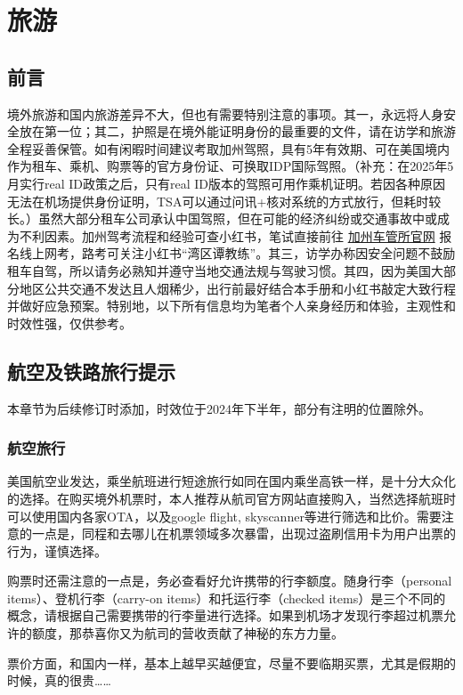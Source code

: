 \chapter{旅游}

\section{前言}
境外旅游和国内旅游差异不大，但也有需要特别注意的事项。其一，永远将人身安全放在第一位；其二，护照是在境外能证明身份的最重要的文件，请在访学和旅游全程妥善保管。如有闲暇时间建议考取加州驾照，具有5年有效期、可在美国境内作为租车、乘机、购票等的官方身份证、可换取IDP国际驾照。（补充：在2025年5月实行real ID政策之后，只有real ID版本的驾照可用作乘机证明。若因各种原因无法在机场提供身份证明，TSA可以通过问讯+核对系统的方式放行，但耗时较长。）虽然大部分租车公司承认中国驾照，但在可能的经济纠纷或交通事故中或成为不利因素。加州驾考流程和经验可查小红书，笔试直接前往 \href{https://www.dmv.ca.gov/}{加州车管所官网} 报名线上网考，路考可关注小红书“湾区谭教练”。其三，访学办称因安全问题不鼓励租车自驾，所以请务必熟知并遵守当地交通法规与驾驶习惯。其四，因为美国大部分地区公共交通不发达且人烟稀少，出行前最好结合本手册和小红书敲定大致行程并做好应急预案。特别地，以下所有信息均为笔者个人亲身经历和体验，主观性和时效性强，仅供参考。

\section{航空及铁路旅行提示}
本章节为后续修订时添加，时效位于2024年下半年，部分有注明的位置除外。

\subsection{航空旅行}
美国航空业发达，乘坐航班进行短途旅行如同在国内乘坐高铁一样，是十分大众化的选择。在购买境外机票时，本人推荐从航司官方网站直接购入，当然选择航班时可以使用国内各家OTA，以及google flight, skyscanner等进行筛选和比价。需要注意的一点是，同程和去哪儿在机票领域多次暴雷，出现过盗刷信用卡为用户出票的行为，谨慎选择。

购票时还需注意的一点是，务必查看好允许携带的行李额度。随身行李（personal items）、登机行李（carry-on items）和托运行李（checked items）是三个不同的概念，请根据自己需要携带的行李量进行选择。如果到机场才发现行李超过机票允许的额度，那恭喜你又为航司的营收贡献了神秘的东方力量。

票价方面，和国内一样，基本上越早买越便宜，尽量不要临期买票，尤其是假期的时候，真的很贵……

